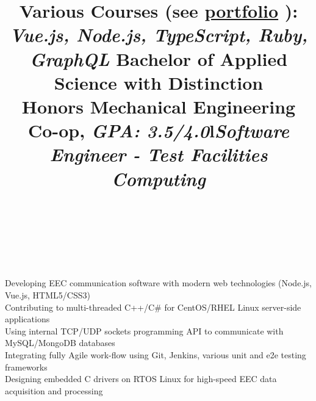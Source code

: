 \documentclass[mm]{res}
\begin{document}
\begin{resume}
\title{Various Courses (see \href{\myport}{portfolio}  \faGlobe): \\
\textsl{Vue.js, Node.js, TypeScript, Ruby, GraphQL}
}
\begin{position}
\end{position}

\title{Bachelor of Applied Science with Distinction\\
Honors Mechanical Engineering Co-op, \textsl{GPA: 3.5/4.0}}
\begin{position}
\end{position}

\toprule

\section{\headingexperience}
\begin{format}
\\
\title{l}\\
\body\\
\end{format}

\title{\textsl{Software Engineer - Test Facilities Computing}}
\begin{position}
\tb Developing EEC communication software with modern web technologies (Node.js, Vue.js, HTML5/CSS3)\\
\tb Contributing to multi-threaded C++/C\# for CentOS/RHEL Linux server-side applications\\
\tb Using internal TCP/UDP sockets programming API to communicate with MySQL/MongoDB databases\\
\tb Integrating fully Agile work-flow using Git, Jenkins, various unit and e2e testing frameworks \\
\tb Designing embedded C drivers on RTOS Linux for high-speed EEC data acquisition and processing
\end{position}


\end{resume}
\end{document}
